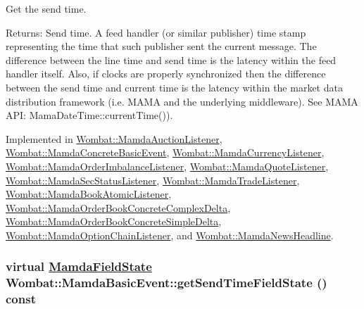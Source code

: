 Get the send time. 

\begin{Desc}
\item[Returns:]Send time. A feed handler (or similar publisher) time stamp representing the time that such publisher sent the current message. The difference between the line time and send time is the latency within the feed handler itself. Also, if clocks are properly synchronized then the difference between the send time and current time is the latency within the market data distribution framework (i.e. MAMA and the underlying middleware). See MAMA API: Mama\-Date\-Time::current\-Time()). \end{Desc}


Implemented in \hyperlink{classWombat_1_1MamdaAuctionListener_8258accabbd79b1ab817055b83aff153}{Wombat::Mamda\-Auction\-Listener}, \hyperlink{classWombat_1_1MamdaConcreteBasicEvent_ae7959d79489a7d4c036c0cfadda6764}{Wombat::Mamda\-Concrete\-Basic\-Event}, \hyperlink{classWombat_1_1MamdaCurrencyListener_dc787103b73d10a395458a270e78d69b}{Wombat::Mamda\-Currency\-Listener}, \hyperlink{classWombat_1_1MamdaOrderImbalanceListener_ccbfe5ac89809e35624d42faa0c40a1b}{Wombat::Mamda\-Order\-Imbalance\-Listener}, \hyperlink{classWombat_1_1MamdaQuoteListener_3937e363870aeca07238a7253653ee6a}{Wombat::Mamda\-Quote\-Listener}, \hyperlink{classWombat_1_1MamdaSecStatusListener_74b08a2717cecd05952794bcc3e9165a}{Wombat::Mamda\-Sec\-Status\-Listener}, \hyperlink{classWombat_1_1MamdaTradeListener_db49cd3341a07e0659b16b6166d56c3a}{Wombat::Mamda\-Trade\-Listener}, \hyperlink{classWombat_1_1MamdaBookAtomicListener_b3acc7062c4aefa9bc7da4a6f810f5d1}{Wombat::Mamda\-Book\-Atomic\-Listener}, \hyperlink{classWombat_1_1MamdaOrderBookConcreteComplexDelta_5465c0fc1945d5e28f17972ed12f2bbb}{Wombat::Mamda\-Order\-Book\-Concrete\-Complex\-Delta}, \hyperlink{classWombat_1_1MamdaOrderBookConcreteSimpleDelta_8df1e676c05ca64e009164354f2b68fb}{Wombat::Mamda\-Order\-Book\-Concrete\-Simple\-Delta}, \hyperlink{classWombat_1_1MamdaOptionChainListener_81cfb2c76079da7867841b94da24b6de}{Wombat::Mamda\-Option\-Chain\-Listener}, and \hyperlink{classWombat_1_1MamdaNewsHeadline_aaae18e2229981540e00408cad367103}{Wombat::Mamda\-News\-Headline}.\hypertarget{classWombat_1_1MamdaBasicEvent_418ecb29b412cd42581b54c87b5360fd}{
\subsubsection[getSendTimeFieldState]{\setlength{\rightskip}{0pt plus 5cm}virtual \hyperlink{namespaceWombat_93aac974f2ab713554fd12a1fa3b7d2a}{Mamda\-Field\-State} Wombat::Mamda\-Basic\-Event::get\-Send\-Time\-Field\-State () const}}
\label{classWombat_1_1MamdaBasicEvent_418ecb29b412cd42581b54c87b5360fd}


